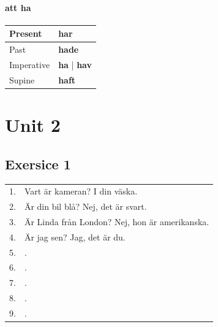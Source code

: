 \documentclass[9pt, oneside]{article}
\begin{document}
\paragraph*{att ha}
\begin{tabular}{l|l}
	Present & {\bfseries har}\\
	\hline
	Past & {\bfseries hade}\\
	\hline
	Imperative & {\bfseries ha} | {\bfseries hav}\\
	\hline
	Supine & {\bfseries haft}\\
\end{tabular}

\section{Unit 2}
\subsection{Exersice 1}

\begin{tabular}{l l}
1. & Vart är kameran? I din väska. \\
2. & Är din bil blå? Nej, det är svart.\\
3. & Är Linda från London? Nej, hon är amerikanska.\\
4. & Är jag sen? Jag, det är du.\\
5. & .\\
6. & .\\
7. & .\\
8. & .\\
9. &.\\
\end{tabular}
\end{document}
